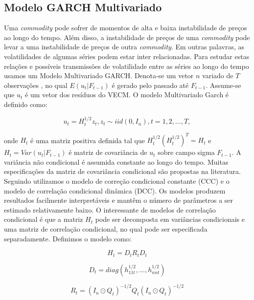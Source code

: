  
  \subsection{Modelo GARCH Multivariado} 
 
 
 Uma \emph{commodity} pode  sofrer de momentos de alta e baixa instabilidade de preços ao longo do tempo. Além disso, a instabilidade de preços de uma \emph{commodity} pode levar a uma instabilidade de preços de outra \emph{commodity}. Em outras palavras, as volatilidades de algumas séries podem estar inter relacionadas.  Para estudar estas relações  e possíveis transmissões  de volatilidade entre as séries ao longo do tempo usamos um Modelo Multivariado GARCH. 
 Denota-se um vetor $n$ variado de $T$ observações , no qual $E(u_t|F_{t-1})$ é gerado pelo passado até $F_{t-1}$. Assume-se que $u_t$ é um vetor dos resíduos do VECM. O modelo Multivariado Garch é definido como:
 
   \begin{equation}
   u_t=H_{t}^{1/2} z_t,  z_t \sim iid(0,I_n), t=1,2,\dots,T,
   \end{equation}
 
  onde $H_t$ é uma matriz positiva definida tal que $H_{t}^{1/2}(H_{t}^{1/2})^T=H_t$ e $H_t=Var(u_t|F_{t-1})$ é  matriz de covariância de $u_t$ sobre campo sigma $F_{t-1}$. A variância não condicional é assumida constante ao longo do tempo. Muitas especificações da matriz de covariância condicional são propostas na literatura. Seguindo  utilizamos o modelo de correção condicional constante (CCC) e o   modelo de correlação condicional dinâmica (DCC). Os modelos produzem resultados facilmente interpretáveis e mantêm o número de parâmetros a ser estimado relativamente baixo. O interessante de modelos de correlação condicional é que a matriz $H_t$ pode ser decomposta em variâncias condicionais e uma matriz de correlação condicional, no qual pode ser especificada separadamente. Definimos o modelo como:
  
    \begin{equation}
    H_{t}=D_t R_t D_t
    \end{equation}
  
     \begin{equation}
     D_{t}=diag(h_{1 1t}^{1/2},\dots,h_{n nt}^{1/2})
     \end{equation}
 
  \begin{equation}
  R_{t}=(I_n \odot Q_t)^{-1/2} Q_t(I_n \odot Q_t)^{-1/2}
  \end{equation}
 

